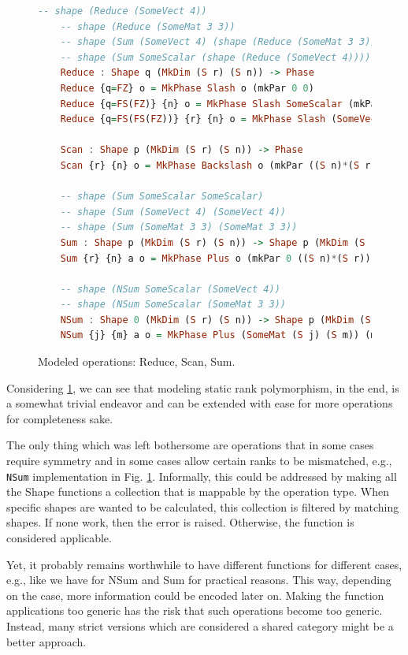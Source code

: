 \documentclass{report}
\begin{document}
\begin{figure}
\begin{lstlisting}[language=Haskell]
    -- shape (Reduce (SomeVect 4))
    -- shape (Reduce (SomeMat 3 3))
    -- shape (Sum (SomeVect 4) (shape (Reduce (SomeMat 3 3))))
    -- shape (Sum SomeScalar (shape (Reduce (SomeVect 4))))
    Reduce : Shape q (MkDim (S r) (S n)) -> Phase
    Reduce {q=FZ} o = MkPhase Slash o (mkPar 0 0)
    Reduce {q=FS(FZ)} {n} o = MkPhase Slash SomeScalar (mkPar (S n) 0)
    Reduce {q=FS(FS(FZ))} {r} {n} o = MkPhase Slash (SomeVect (S n)) (mkPar ((S n)*(S r)) 0)
    
    Scan : Shape p (MkDim (S r) (S n)) -> Phase
    Scan {r} {n} o = MkPhase Backslash o (mkPar ((S n)*(S r)) 0)
    
    -- shape (Sum SomeScalar SomeScalar)
    -- shape (Sum (SomeVect 4) (SomeVect 4))
    -- shape (Sum (SomeMat 3 3) (SomeMat 3 3))
    Sum : Shape p (MkDim (S r) (S n)) -> Shape p (MkDim (S r) (S n)) -> Phase
    Sum {r} {n} a o = MkPhase Plus o (mkPar 0 ((S n)*(S r)))
    
    -- shape (NSum SomeScalar (SomeVect 4))
    -- shape (NSum SomeScalar (SomeMat 3 3))
    NSum : Shape 0 (MkDim (S r) (S n)) -> Shape p (MkDim (S j) (S m)) -> Phase
    NSum {j} {m} a o = MkPhase Plus (SomeMat (S j) (S m)) (mkPar 0 ((S j)*(S m)))   
\end{lstlisting}
    \caption{Modeled operations: Reduce, Scan, Sum.}
    \label{fig:modeled}
\end{figure}

Considering \ref{fig:modeled}, we can see that modeling static rank polymorphism, in the end, is a somewhat trivial endeavor and can be extended with ease for more operations for completeness sake.

The only thing which was left bothersome are operations that in some cases require symmetry and in some cases allow certain ranks to be mismatched, e.g., \verb|NSum| implementation in Fig. \ref{fig:modeled}. Informally, this could be addressed by making all the Shape functions a collection that is mappable by the operation type. When specific shapes are wanted to be calculated, this collection is filtered by matching shapes. If none work, then the error is raised. Otherwise, the function is considered applicable.

Yet, it probably remains worthwhile to have different functions for different cases, e.g., like we have for NSum and Sum for practical reasons. This way, depending on the case, more information could be encoded later on. Making the function applications too generic has the risk that such operations become too generic. Instead, many strict versions which are considered a shared category might be a better approach.
\end{document}
